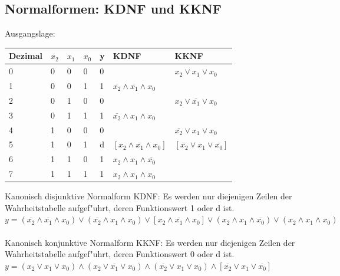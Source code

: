 \subsection{Normalformen: KDNF und KKNF}
	\begin{minipage}{10cm}
		Ausgangslage:\\
		\begin{tabular}{|l|l|l|l|l||l||l|}
			\hline	
				Dezimal & $x_2$ & $x_1$ & $x_0$ & y & KDNF & KKNF\\	
			\hline
			\hline
				0 & 0 & 0 & 0 & 0 & & $x_2 \vee x_1 \vee x_0$ \\
			\hline	
				1 & 0 & 0 & 1 & 1 &	$\overline{x_2} \wedge \overline{x_1} \wedge x_0$ & \\
			\hline
				2 & 0 & 1 & 0 & 0 & & $x_2 \vee \overline{x_1} \vee x_0$  \\
			\hline
				3 & 0 & 1 & 1 & 1 &	$\overline{x_2} \wedge x_1 \wedge x_0$ & \\
			\hline
				4 & 1 & 0 & 0 & 0 & & $\overline{x_2} \vee x_1 \vee x_0$ \\
			\hline
				5 & 1 & 0 & 1 & d & $[x_2 \wedge \overline{x_1} \wedge x_0]$ & $[\overline{x_2} \vee x_1 \vee \overline{x_0}]$  \\
			\hline
				6 & 1 & 1 & 0 & 1 & $x_2 \wedge x_1 \wedge \overline{x_0}$ &  \\
			\hline
				7 & 1 & 1 & 1 & 1 & $x_2 \wedge x_1 \wedge x_0$ &\\
			\hline
		\end{tabular}
\end{minipage}
\begin{minipage}{8cm}
Kanonisch disjunktive Normalform \lbrack KDNF\rbrack: Es werden nur diejenigen Zeilen der Wahrheitstabelle aufgef"uhrt, deren Funktionswert 1 oder d ist. \\
$y=(\overline{x_2} \wedge \overline{x_1} \wedge x_0) \vee (\overline{x_2} \wedge x_1 \wedge x_0) \vee [x_2 \wedge \overline{x_1} \wedge x_0] \vee (x_2 \wedge x_1 \wedge \overline{x_0}) \vee (x_2 \wedge x_1 \wedge x_0)$ \\
\\
Kanonisch konjunktive Normalform \lbrack KKNF\rbrack: 
Es werden nur diejenigen Zeilen der Wahrheitstabelle aufgef"uhrt, deren Funktionswert 0 oder d ist. \\
$y=(x_2 \vee x_1 \vee x_0) \wedge (x_2 \vee \overline{x_1} \vee x_0) \wedge (\overline{x_2} \vee x_1 \vee x_0) \wedge [\overline{x_2} \vee x_1 \vee \overline{x_0}]$ \\
\end{minipage}
